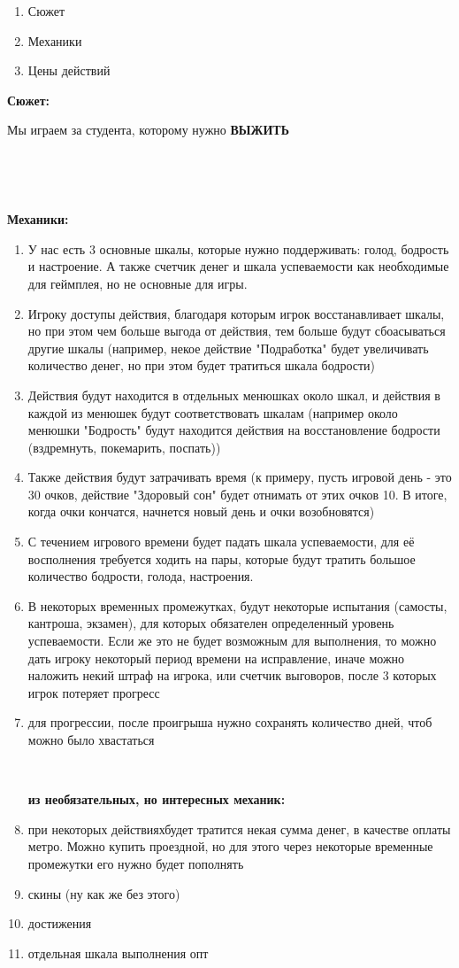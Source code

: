 \documentclass[]{article}
\begin{document}
	\begin{enumerate}[1. ]
		\item Сюжет
		\item Механики
		\item Цены действий
	\end{enumerate}
	\newpage
	
	\large{\textbf{Сюжет:}}
	\par Мы играем за студента, которому нужно \textbf{ВЫЖИТЬ}

	\
	
	\
	
	\large{\textbf{Механики:}}
	\begin{enumerate}[- ]
		\item У нас есть 3 основные шкалы, которые нужно поддерживать: голод, бодрость и настроение. А также счетчик денег и шкала успеваемости как необходимые для геймплея, но не основные для игры.
		\item Игроку доступы действия, благодаря которым игрок восстанавливает шкалы, но при этом чем больше выгода от действия, тем больше будут сбоасываться другие шкалы (например, некое действие "Подработка" будет увеличивать количество денег, но при этом будет тратиться шкала бодрости)
		\item Действия будут находится в отдельных менюшках около шкал, и действия в каждой из менюшек будут соответствовать шкалам (например около менюшки "Бодрость" будут находится действия на восстановление бодрости (вздремнуть, покемарить, поспать))
		\item Также действия будут затрачивать время (к примеру, пусть игровой день - это 30 очков, действие "Здоровый сон" будет отнимать от этих очков 10. В итоге, когда очки кончатся, начнется новый день и очки возобновятся)
		\item С течением игрового времени будет падать шкала успеваемости, для её восполнения требуется ходить на пары, которые будут тратить большое количество бодрости, голода, настроения.
		\item В некоторых временных промежутках, будут некоторые испытания (самосты, кантроша, экзамен), для которых обязателен определенный уровень успеваемости. Если же это не будет возможным для выполнения, то можно дать игроку некоторый период времени на исправление, иначе можно наложить некий штраф на игрока, или счетчик выговоров, после 3 которых игрок потеряет прогресс
		\item для прогрессии, после проигрыша нужно сохранять количество дней, чтоб можно было хвастаться
		\ 
		
		\
		
		\textbf{из необязательных, но интересных механик:}
		\item при некоторых действияхбудет тратится некая сумма денег, в качестве оплаты метро. Можно купить проездной, но для этого через некоторые временные промежутки его нужно будет пополнять
		\item скины (ну как же без этого)
		\item достижения
		\item отдельная шкала выполнения опт
	\end{enumerate}
	
\end{document}
